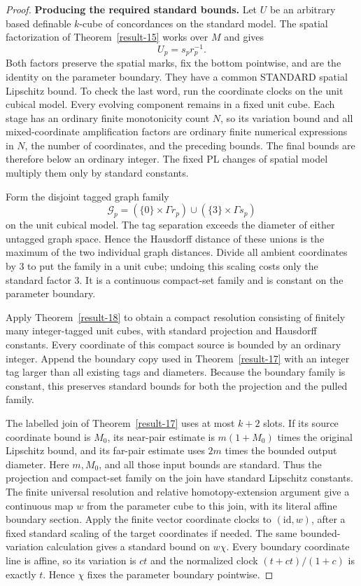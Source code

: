 \documentclass[11pt,a4paper]{article}
\theoremstyle{definition}
\begin{document}
\begin{proof}
\textbf{Producing the required standard bounds.}\quad
Let $U$ be an arbitrary based definable $k$-cube of concordances
on the standard model. The spatial factorization of Theorem~\ref{result-15}
works over $M$ and gives
\begin{equation}
 U_p=s_pr_p^{-1}.
 \label{equation-111}
\end{equation}
Both factors preserve the spatial marks, fix the bottom pointwise,
and are the identity on the parameter boundary. They have a
common STANDARD spatial Lipschitz bound. To check the last
word, run the coordinate clocks on the unit cubical model.
Every evolving component remains in a fixed unit cube. Each
stage has an ordinary finite monotonicity count $N$, so its
variation bound and all mixed-coordinate amplification factors
are ordinary finite numerical expressions in $N$, the number
of coordinates, and the preceding bounds. The final bounds
are therefore below an ordinary integer. The fixed PL changes
of spatial model multiply them only by standard constants.

Form the disjoint tagged graph family
\begin{equation}
 \mathcal G_p=
  (\{0\}\times\Gamma r_p)\cup
  (\{3\}\times\Gamma s_p)
 \label{equation-112}
\end{equation}
on the unit cubical model. The tag separation exceeds the
diameter of either untagged graph space. Hence the Hausdorff
distance of these unions is the maximum of the two individual
graph distances. Divide all ambient coordinates by $3$ to put
the family in a unit cube; undoing this scaling costs only the
standard factor $3$. It is a continuous compact-set family and
is constant on the parameter boundary.

Apply Theorem~\ref{result-18} to obtain a compact resolution consisting of
finitely many integer-tagged unit cubes, with standard
projection and Hausdorff constants. Every coordinate of this
compact source is bounded by an ordinary integer. Append the
boundary copy used in Theorem~\ref{result-17} with an integer tag larger than
all existing tags and diameters. Because the boundary family
is constant, this preserves standard bounds for both the
projection and the pulled family.

The labelled join of Theorem~\ref{result-17} uses at most $k+2$ slots. If its
source coordinate bound is $M_0$, its near-pair estimate is
$m(1+M_0)$ times the original Lipschitz bound, and its far-pair
estimate uses $2m$ times the bounded output diameter. Here
$m,M_0$, and all those input bounds are standard. Thus the
projection and compact-set family on the join have standard
Lipschitz constants. The finite universal resolution and
relative homotopy-extension argument give a continuous
map $w$ from the parameter cube to this join, with its literal
affine boundary section. Apply the finite vector coordinate
clocks to $(\mathrm{id},w)$, after a fixed standard scaling of
the target coordinates if needed. The same bounded-variation
calculation gives a standard bound on $w\chi$. Every boundary
coordinate line is affine, so its variation is $ct$ and the
normalized clock $(t+ct)/(1+c)$ is exactly $t$. Hence
$\chi$ fixes the parameter boundary pointwise.


\end{proof}
\end{document}
